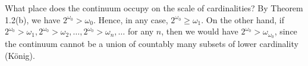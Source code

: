 What place does the continuum occupy on the scale of cardinalities?
By Theorem 1.2(b), we have $2^{\omega_0} > \omega_0$.
Hence, in any case, $2^{\omega_0} \geqslant \omega_1$.
On the other hand, if $2^{\omega_0} > \omega_1, 2^{\omega_0} > \omega_2, \ldots, 2^{\omega_0} > \omega_n, \ldots$ for any $n$, then we would have $2^{\omega_0} > \omega_{\omega_0}$, since the continuum cannot be a union of countably many subsets of lower cardinality (K\"onig).